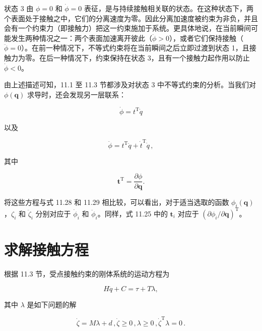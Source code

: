 \documentclass[10pt,a4paper]{book}
\theoremstyle{thmstyle} %
\theoremstyle{defstyle} %
\theoremstyle{prostyle} %
\begin{document}
状态 3 由 $\phi=0$ 和 $\dot{\phi}=0$ 表征，是与持续接触相关联的状态。在这种状态下，两个表面处于接触之中，它们的分离速度为零。因此分离加速度被约束为非负，并且会有一个约束力（即接触力）把这一约束施加于系统。更具体地说，在当前瞬间可能发生两种情况之一：两个表面加速离开彼此（$\ddot{\phi}>0$），或者它们保持接触（$\ddot{\phi}=0$）。在前一种情况下，不等式约束将在当前瞬间之后立即过渡到状态 1，且接触力为零。在后一种情况下，约束保持在状态 3，且有一个接触力起作用以防止 $\dot{\phi}<0$。



由上述描述可知，11.1 至 11.3 节都涉及对状态 3 中不等式约束的分析。当我们对 $\phi(\boldsymbol{q})$ 求导时，还会发现另一层联系：



$$
\dot { \phi } = t ^{\mathrm { T} } \dot { q }
$$



以及



$$
\ddot { \phi } = t ^{\mathrm { T} } \ddot { q } + \dot { t } ^{\mathrm { T} } \dot { q } \, ,
$$



其中



$$
{ \boldsymbol { t } } ^{\mathrm { T} } = { \frac { \partial \phi } { \partial { \boldsymbol { q } } } } .
$$



将这些方程与式 11.28 和 11.29 相比较，可以看出，对于适当选取的函数 $\phi_{i}(\boldsymbol{q})$，$\zeta_{i}$ 和 $\ddot{\zeta}_{i}$ 分别对应于 $\dot{\phi}_{i}$ 和 $\ddot{\phi}_{i}$。同样，式 11.25 中的 $\boldsymbol{t}_{i}$ 对应于 $(\partial\phi_{i}/\partial\boldsymbol{q})^{\mathrm{T}}$。



\section{求解接触方程}





根据 11.3 节，受点接触约束的刚体系统的运动方程为



$$
H \ddot { q } + C = \tau + T \lambda ,
$$



其中 $\lambda$ 是如下问题的解



$$
\dot { \zeta } = M \lambda + d \, ,  \dot { \zeta } \geq 0 \, ,  \lambda \geq 0 \, ,  \dot { \zeta } ^{\mathrm { T} } \lambda = 0 \, .
$$
\end{document}
